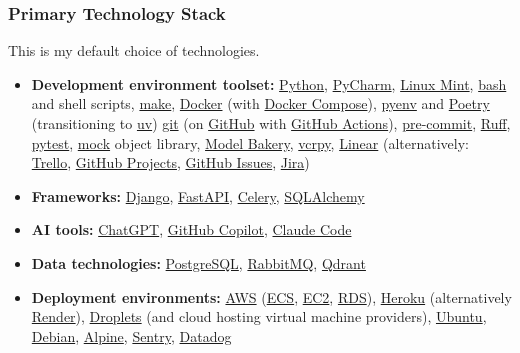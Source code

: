 \documentclass[a4paper,8pt]{extarticle}
\newcommand{\python}{\href{https://www.python.org/}{Python}}
\newcommand{\django}{\href{https://www.djangoproject.com/}{Django}}
\newcommand{\fastapi}{\href{https://fastapi.tiangolo.com/}{FastAPI}}
\newcommand{\celery}{\href{https://docs.celeryq.dev/}{Celery}}
\newcommand{\postgresql}{\href{https://www.postgresql.org/}{PostgreSQL}}
\newcommand{\rabbitmq}{\href{https://www.rabbitmq.com/}{RabbitMQ}}
\newcommand{\awsecs}{\href{https://aws.amazon.com/ecs/}{ECS}}
\newcommand{\awsectwo}{\href{https://aws.amazon.com/ec2/}{EC2}}
\newcommand{\awsrds}{\href{https://aws.amazon.com/rds/}{RDS}}
\begin{document}
\subsubsection*{\hypertarget{primary-technology-stack}{Primary Technology Stack}}
This is my default choice of technologies.
\begin{itemize}
    \item \textbf{Development environment toolset:} \python, \href{https://www.jetbrains.com/pycharm/}{PyCharm}, \href{https://linuxmint.com/}{Linux Mint}, \href{https://www.gnu.org/software/bash/}{bash} and shell scripts, \href{https://www.gnu.org/software/make/manual/make.html}{make}, \href{https://www.docker.com/}{Docker} (with \href{https://docs.docker.com/compose/}{Docker Compose}), \href{https://github.com/pyenv/pyenv}{pyenv} and \href{https://python-poetry.org/}{Poetry} (transitioning to \href{https://docs.astral.sh/uv/}{uv}) \href{https://git-scm.com/}{git} (on \href{https://github.com/}{GitHub} with \href{https://github.com/features/actions}{GitHub Actions}), \href{https://pre-commit.com/}{pre-commit}, \href{https://docs.astral.sh/ruff/}{Ruff}, \href{https://docs.pytest.org/}{pytest}, \href{https://docs.python.org/3/library/unittest.mock.html}{mock} object library, \href{https://model-bakery.readthedocs.io/}{Model Bakery}, \href{https://vcrpy.readthedocs.io/}{vcrpy}, \href{https://linear.app/}{Linear} (alternatively: \href{https://trello.com/}{Trello}, \href{https://docs.github.com/en/issues/planning-and-tracking-with-projects/learning-about-projects/about-projects}{GitHub Projects}, \href{https://github.com/features/issues}{GitHub Issues}, \href{https://www.atlassian.com/software/jira}{Jira})
    \item \textbf{Frameworks:} \django, \fastapi, \celery, \href{https://www.sqlalchemy.org/}{SQLAlchemy}
    \item \textbf{AI tools:} \href{https://chatgpt.com/}{ChatGPT}, \href{https://github.com/features/copilot}{GitHub Copilot}, \href{https://www.anthropic.com/claude-code}{Claude Code}
    \item \textbf{Data technologies:} \postgresql, \rabbitmq, \href{https://qdrant.tech/}{Qdrant}
    \item \textbf{Deployment environments:} \href{https://aws.amazon.com/}{AWS} (\awsecs, \awsectwo, \awsrds), \href{https://www.heroku.com/}{Heroku} (alternatively \href{https://render.com/}{Render}), \href{https://docs.digitalocean.com/products/droplets/}{Droplets} (and cloud hosting virtual machine providers), \href{https://ubuntu.com/}{Ubuntu}, \href{https://www.debian.org/}{Debian}, \href{https://alpinelinux.org/}{Alpine}, \href{https://sentry.io/}{Sentry}, \href{https://www.datadoghq.com/}{Datadog}

\end{itemize}
\end{document}
